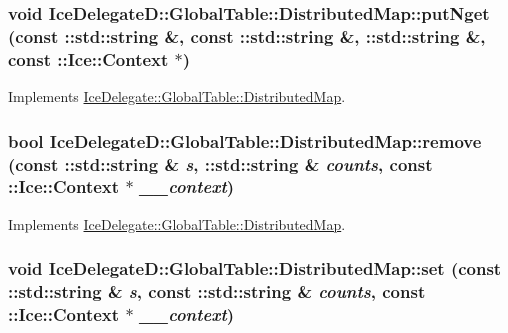 \hypertarget{class_ice_delegate_d_1_1_global_table_1_1_distributed_map_a3a757d412fceeec2cbc53baa79f417fe}{
\subsubsection[{putNget}]{\setlength{\rightskip}{0pt plus 5cm}void IceDelegateD::GlobalTable::DistributedMap::putNget (const ::std::string \&, \/  const ::std::string \&, \/  ::std::string \&, \/  const ::Ice::Context $\ast$)}}
\label{class_ice_delegate_d_1_1_global_table_1_1_distributed_map_a3a757d412fceeec2cbc53baa79f417fe}


Implements \hyperlink{class_ice_delegate_1_1_global_table_1_1_distributed_map_a41847e7af4589564ef39469d2628a09c}{IceDelegate::GlobalTable::DistributedMap}.

\hypertarget{class_ice_delegate_d_1_1_global_table_1_1_distributed_map_a6b2ca81f9b87def03aee564bed45a8a5}{
\subsubsection[{remove}]{\setlength{\rightskip}{0pt plus 5cm}bool IceDelegateD::GlobalTable::DistributedMap::remove (const ::std::string \& {\em s}, \/  ::std::string \& {\em counts}, \/  const ::Ice::Context $\ast$ {\em \_\-\_\-context})}}
\label{class_ice_delegate_d_1_1_global_table_1_1_distributed_map_a6b2ca81f9b87def03aee564bed45a8a5}


Implements \hyperlink{class_ice_delegate_1_1_global_table_1_1_distributed_map_aa0616738a0cfb246e9e9921629c8dbd3}{IceDelegate::GlobalTable::DistributedMap}.

\hypertarget{class_ice_delegate_d_1_1_global_table_1_1_distributed_map_a0045800989d60d663a5fdfdb1735cd7a}{
\subsubsection[{set}]{\setlength{\rightskip}{0pt plus 5cm}void IceDelegateD::GlobalTable::DistributedMap::set (const ::std::string \& {\em s}, \/  const ::std::string \& {\em counts}, \/  const ::Ice::Context $\ast$ {\em \_\-\_\-context})}}
\label{class_ice_delegate_d_1_1_global_table_1_1_distributed_map_a0045800989d60d663a5fdfdb1735cd7a}


